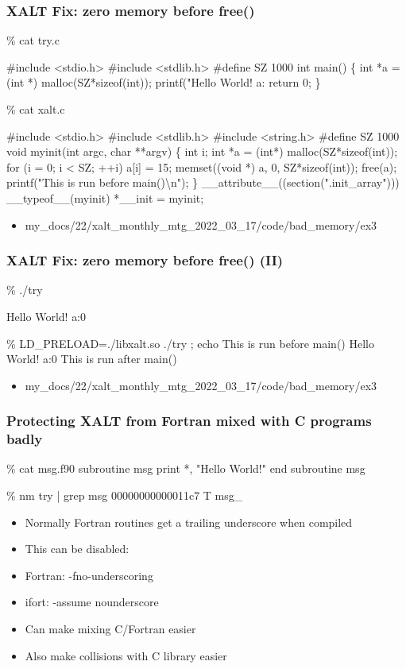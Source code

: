 \documentclass{beamer}
\begin{document}
\begin{frame}[fragile]
    \frametitle{XALT Fix: zero memory before free()}
 {\tiny
    \begin{semiverbatim}
\% cat try.c

#include <stdio.h>
#include <stdlib.h>
#define SZ 1000
int main()
\{
  int *a = (int *) malloc(SZ*sizeof(int));
  printf("Hello World! a:%
  return 0;
\}

\% cat xalt.c

#include <stdio.h>
#include <stdlib.h>
#include <string.h>
#define SZ 1000
void myinit(int argc, char **argv)
\{
  int i;
  int *a = (int*) malloc(SZ*sizeof(int));
  for (i = 0; i < SZ; ++i) a[i] = 15; 
  {\color{blue}{}memset((void *) a, 0, SZ*sizeof(int))};
  free(a);
  printf("This is run before main()\textbackslash{}n");
\}
\_\_attribute\_\_((section(".init\_array"))) \_\_typeof\_\_(myinit) *\_\_init = myinit;
    \end{semiverbatim}
}

  \begin{itemize}
    \item my\_docs/22/xalt\_monthly\_mtg\_2022\_03\_17/code/bad\_memory/ex3
  \end{itemize}
\end{frame}

\begin{frame}[fragile]
    \frametitle{XALT Fix: zero memory before free() (II)}
 {\small
   \begin{semiverbatim}
\% ./try

Hello World! {\color{blue} a:0}

\% LD_PRELOAD=./libxalt.so  ./try  ; echo
This is run before main()
Hello World! {\color{blue} a:0}
This is run after main()
    \end{semiverbatim}
}
  \begin{itemize}
    \item my\_docs/22/xalt\_monthly\_mtg\_2022\_03\_17/code/bad\_memory/ex3
  \end{itemize}
\end{frame}


\begin{frame}[fragile]
    \frametitle{Protecting XALT from Fortran mixed with C programs badly}
 {\tiny
    \begin{semiverbatim}
\% cat msg.f90
subroutine msg
   print *, "Hello World!"
end subroutine msg

\% nm try | grep msg
00000000000011c7 T msg_
    \end{semiverbatim}
}
  \begin{itemize}
    \item Normally Fortran routines get a trailing underscore
      when compiled
    \item This can be disabled:
    \item Fortran: -fno-underscoring
    \item ifort:    -assume nounderscore
    \item Can make mixing C/Fortran easier
    \item Also make collisions with C library easier
  \end{itemize}
\end{frame}
\end{document}
